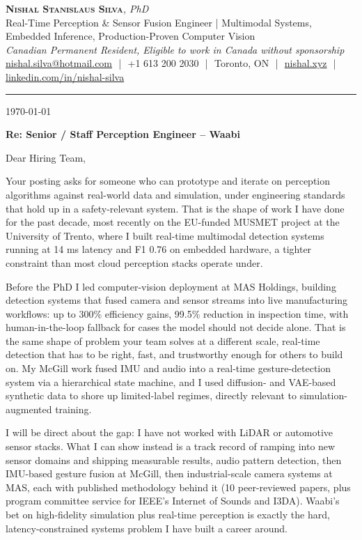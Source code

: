 \documentclass[11pt]{article}
\newcommand{\clName}{Nishal Stanislaus Silva}
\newcommand{\clStatus}{Canadian Permanent Resident, Eligible to work in Canada without sponsorship}
\newcommand{\clTagline}{Real-Time Perception \& Sensor Fusion Engineer | Multimodal Systems, Embedded Inference, Production-Proven Computer Vision}
\newcommand{\clRole}{Senior / Staff Perception Engineer}
\newcommand{\clCompany}{Waabi}
\begin{document}
\pagestyle{empty}
\begin{center}
    {\LARGE \scshape \textbf{\clName}}{\large \textit{, PhD}}
    \\[1pt]
    {\small \clTagline}
    \\[1pt]
    {\footnotesize\textit{\clStatus}}
    \\[1pt]
    {\small
    \href{mailto:nishal.silva@hotmail.com}{nishal.silva@hotmail.com}
    \,\,|\,\, +1 613 200 2030
    \,\,|\,\, Toronto, ON
    \,\,|\,\, \href{https://nishal.xyz}{nishal.xyz}
    \,\,|\,\, \href{https://www.linkedin.com/in/nishal-silva}{linkedin.com/in/nishal-silva}}
\end{center}

\rule{\linewidth}{0.4pt}\vspace{0.6em}

\today

\textbf{Re: \clRole{} -- \clCompany{}}

Dear Hiring Team,

Your posting asks for someone who can prototype and iterate on perception algorithms against real-world data and simulation, under engineering standards that hold up in a safety-relevant system. That is the shape of work I have done for the past decade, most recently on the EU-funded MUSMET project at the University of Trento, where I built real-time multimodal detection systems running at 14 ms latency and F1 0.76 on embedded hardware, a tighter constraint than most cloud perception stacks operate under.

Before the PhD I led computer-vision deployment at MAS Holdings, building detection systems that fused camera and sensor streams into live manufacturing workflows: up to 300\% efficiency gains, 99.5\% reduction in inspection time, with human-in-the-loop fallback for cases the model should not decide alone. That is the same shape of problem your team solves at a different scale, real-time detection that has to be right, fast, and trustworthy enough for others to build on. My McGill work fused IMU and audio into a real-time gesture-detection system via a hierarchical state machine, and I used diffusion- and VAE-based synthetic data to shore up limited-label regimes, directly relevant to simulation-augmented training.

I will be direct about the gap: I have not worked with LiDAR or automotive sensor stacks. What I can show instead is a track record of ramping into new sensor domains and shipping measurable results, audio pattern detection, then IMU-based gesture fusion at McGill, then industrial-scale camera systems at MAS, each with published methodology behind it (10 peer-reviewed papers, plus program committee service for IEEE's Internet of Sounds and I3DA). Waabi's bet on high-fidelity simulation plus real-time perception is exactly the hard, latency-constrained systems problem I have built a career around.
\end{document}
